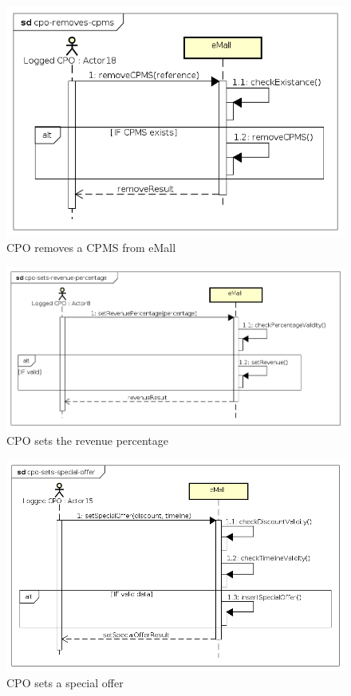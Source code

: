 \begin{figure}[!h]
    \begin{center}
        \includegraphics[keepaspectratio, width=16cm]{Sequence/cpo-removes-cpms.png}
        \caption{\ac{CPO} removes a \ac{CPMS} from \ac{eMall}}
    \end{center}
\end{figure}
\begin{figure}[!h]
    \begin{center}
        \includegraphics[keepaspectratio, width=16cm]{Sequence/cpo-sets-revenue-percentage.png}
        \caption{\ac{CPO} sets the revenue percentage}
    \end{center}
\end{figure}
\begin{figure}[!h]
    \begin{center}
        \includegraphics[keepaspectratio, width=16cm]{Sequence/cpo-sets-special-offer.png}
        \caption{\ac{CPO} sets a special offer}
    \end{center}
\end{figure}

